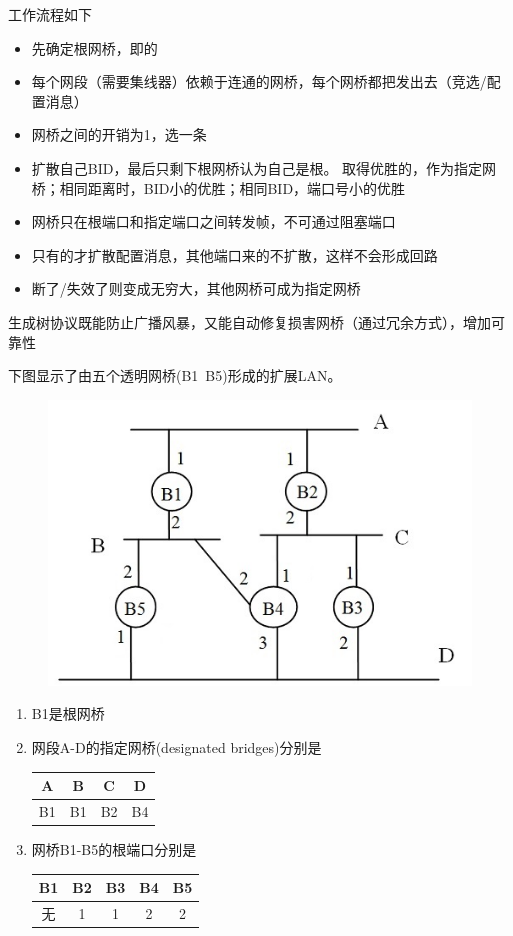 工作流程如下
\begin{itemize}
\item 先确定根网桥，即的
\item 每个网段（需要集线器）依赖于连通的网桥，每个网桥都把发出去（竞选/配置消息）
\item 网桥之间的开销为1，选一条
\item 扩散自己BID，最后只剩下根网桥认为自己是根。
取得优胜的，作为指定网桥；相同距离时，BID小的优胜；相同BID，端口号小的优胜
\item 网桥只在根端口和指定端口之间转发帧，不可通过阻塞端口
\item 只有的才扩散配置消息，其他端口来的不扩散，这样不会形成回路
\item 断了/失效了则变成无穷大，其他网桥可成为指定网桥
\end{itemize}

生成树协议既能防止广播风暴，又能自动修复损害网桥（通过冗余方式），增加可靠性
\begin{example}
	下图显示了由五个透明网桥(B1~B5)形成的扩展LAN。
	\begin{figure}[H]
		\centering
		\includegraphics[width=0.4\linewidth]{fig/bridge.jpg}
	\end{figure}
\end{example}
\begin{analysis}
\begin{enumerate}
	\item B1是根网桥
	\item 网段A-D的指定网桥(designated bridges)分别是
\begin{center}
	\begin{tabular}{|c|c|c|c|}\hline
		A & B & C & D\\\hline
		B1 & B1 & B2 & B4\\\hline
	\end{tabular}
\end{center}
\item 网桥B1-B5的根端口分别是
\begin{center}
	\begin{tabular}{|c|c|c|c|c|}\hline
		B1 & B2 & B3 & B4 & B5\\\hline
		无 & 1 & 1 & 2 & 2\\\hline
	\end{tabular}
\end{center}
\end{enumerate}
\end{analysis}

